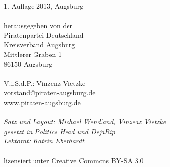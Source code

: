 \thispagestyle{empty}
\vspace*{\fill}
\begin{minipage}{\textwidth}
  \begin{small}
    \begin{singlespace}
       1. Auflage 2013, Augsburg\\
       \\
       herausgegeben von der\\
       Piratenpartei Deutschland\\
       Kreisverband Augsburg\\
       Mittlerer Graben 1\\
       86150 Augsburg\\
       \\
       V.i.S.d.P.: Vinzenz Vietzke\\
       vorstand@piraten-augsburg.de\\
       www.piraten-augsburg.de\\
       \\
       \textit{
         Satz und Layout: Michael Wendland, Vinzenz Vietzke\\
         gesetzt in Politics Head und DejaRip\\
         Lektorat: Katrin Eberhardt
       }\\
       \\
       lizensiert unter Creative Commons BY-SA 3.0
    \end{singlespace}
  \end{small}
\end{minipage}

